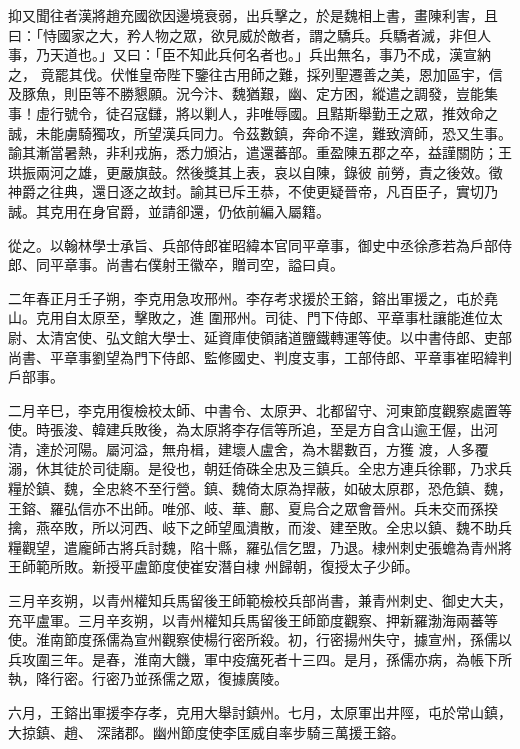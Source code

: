 \begin{pinyinscope}
 抑又聞往者漢將趙充國欲因邊境衰弱，出兵擊之，於是魏相上書，畫陳利害，且曰：「恃國家之大，矜人物之眾，欲見威於敵者，謂之驕兵。兵驕者滅，非但人事，乃天道也。」又曰：「臣不知此兵何名者也。」兵出無名，事乃不成，漢宣納之，
 竟罷其伐。伏惟皇帝陛下鑒往古用師之難，採列聖遷善之美，恩加區宇，信及豚魚，則臣等不勝懇願。況今汴、魏猶艱，幽、定方困，縱遣之調發，豈能集事！虛行號令，徒召寇讎，將以剿人，非唯辱國。且黠斯舉勤王之眾，推效命之誠，未能虜騎獨攻，所望漢兵同力。令茲數鎮，奔命不遑，難致濟師，恐又生事。諭其漸當暑熱，非利戎旃，悉力頒沾，遣還蕃部。重盈陳五郡之卒，益謹關防；王珙振兩河之雄，更嚴旗鼓。然後獎其上表，哀以自陳，錄彼
 前勞，責之後效。徵神爵之往典，還日逐之故封。諭其已斥王恭，不使更疑晉帝，凡百臣子，實切乃誠。其克用在身官爵，並請卻還，仍依前編入屬籍。



 從之。以翰林學士承旨、兵部侍郎崔昭緯本官同平章事，御史中丞徐彥若為戶部侍郎、同平章事。尚書右僕射王徽卒，贈司空，謚曰貞。



 二年春正月壬子朔，李克用急攻邢州。李存考求援於王鎔，鎔出軍援之，屯於堯山。克用自太原至，擊敗之，進
 圍邢州。司徒、門下侍郎、平章事杜讓能進位太尉、太清宮使、弘文館大學士、延資庫使領諸道鹽鐵轉運等使。以中書侍郎、吏部尚書、平章事劉望為門下侍郎、監修國史、判度支事，工部侍郎、平章事崔昭緯判戶部事。



 二月辛巳，李克用復檢校太師、中書令、太原尹、北都留守、河東節度觀察處置等使。時張浚、韓建兵敗後，為太原將李存信等所追，至是方自含山逾王偓，出河清，達於河陽。屬河溢，無舟楫，建壞人盧舍，為木罌數百，方獲
 渡，人多覆溺，休其徒於司徒廟。是役也，朝廷倚硃全忠及三鎮兵。全忠方連兵徐鄆，乃求兵糧於鎮、魏，全忠終不至行營。鎮、魏倚太原為捍蔽，如破太原郡，恐危鎮、魏，王鎔、羅弘信亦不出師。唯邠、岐、華、鄜、夏烏合之眾會晉州。兵未交而孫揆擒，燕卒敗，所以河西、岐下之師望風潰散，而浚、建至敗。全忠以鎮、魏不助兵糧觀望，遣龐師古將兵討魏，陷十縣，羅弘信乞盟，乃退。棣州刺史張蟾為青州將王師範所敗。新授平盧節度使崔安潛自棣
 州歸朝，復授太子少師。



 三月辛亥朔，以青州權知兵馬留後王師範檢校兵部尚書，兼青州刺史、御史大夫，充平盧軍。三月辛亥朔，以青州權知兵馬留後王師節度觀察、押新羅渤海兩蕃等使。淮南節度孫儒為宣州觀察使楊行密所殺。初，行密揚州失守，據宣州，孫儒以兵攻圍三年。是春，淮南大饑，軍中疫癘死者十三四。是月，孫儒亦病，為帳下所執，降行密。行密乃並孫儒之眾，復據廣陵。



 六月，王鎔出軍援李存孝，克用大舉討鎮州。七月，太原軍出井陘，屯於常山鎮，大掠鎮、趙、
 深諸郡。幽州節度使李匡威自率步騎三萬援王鎔。




\end{pinyinscope}
